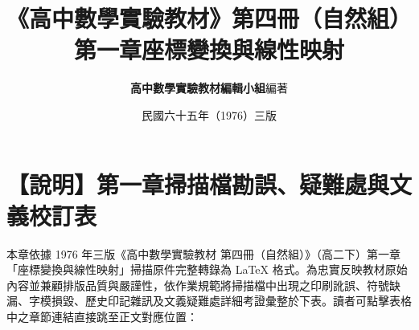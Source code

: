 \documentclass[a4paper,12pt,twoside]{article}
\title{\LARGE\textbf{《高中數學實驗教材》第四冊（自然組）}\\[0.5em] \Large\textbf{第一章\quad 座標變換與線性映射}}
\author{\textbf{高中數學實驗教材編輯小組}\quad 編著}
\date{民國六十五年（1976）三版}
\begin{document}
\maketitle
\thispagestyle{firstpage}

\section*{【說明】第一章掃描檔勘誤、疑難處與文義校訂表}
\label{sec:errata_notes_b4_ch1}

本章依據 1976 年三版《高中數學實驗教材 第四冊（自然組）》（高二下）第一章「座標變換與線性映射」掃描原件完整轉錄為 \LaTeX{} 格式。為忠實反映教材原始內容並兼顧排版品質與嚴謹性，依作業規範將掃描檔中出現之印刷訛誤、符號缺漏、字模損毀、歷史印記雜訊及文義疑難處詳細考證彙整於下表。讀者可點擊表格中之章節連結直接跳至正文對應位置：
\end{document}
